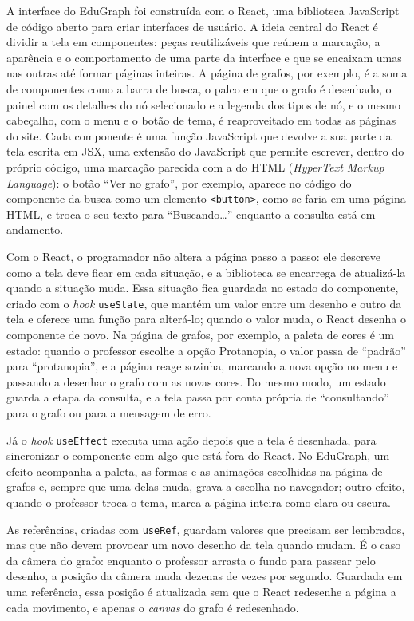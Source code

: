 A interface do EduGraph foi construída com o React, uma biblioteca JavaScript de código aberto para criar interfaces de usuário. A ideia central do React é dividir a tela em componentes: peças reutilizáveis que reúnem a marcação, a aparência e o comportamento de uma parte da interface e que se encaixam umas nas outras até formar páginas inteiras. A página de grafos, por exemplo, é a soma de componentes como a barra de busca, o palco em que o grafo é desenhado, o painel com os detalhes do nó selecionado e a legenda dos tipos de nó, e o mesmo cabeçalho, com o menu e o botão de tema, é reaproveitado em todas as páginas do site. Cada componente é uma função JavaScript que devolve a sua parte da tela escrita em JSX, uma extensão do JavaScript que permite escrever, dentro do próprio código, uma marcação parecida com a do HTML (\textit{HyperText Markup Language}): o botão ``Ver no grafo'', por exemplo, aparece no código do componente da busca como um elemento \texttt{<button>}, como se faria em uma página HTML, e troca o seu texto para ``Buscando\ldots'' enquanto a consulta está em andamento.

Com o React, o programador não altera a página passo a passo: ele descreve como a tela deve ficar em cada situação, e a biblioteca se encarrega de atualizá-la quando a situação muda. Essa situação fica guardada no estado do componente, criado com o \textit{hook} \texttt{useState}, que mantém um valor entre um desenho e outro da tela e oferece uma função para alterá-lo; quando o valor muda, o React desenha o componente de novo. Na página de grafos, por exemplo, a paleta de cores é um estado: quando o professor escolhe a opção Protanopia, o valor passa de ``padrão'' para ``protanopia'', e a página reage sozinha, marcando a nova opção no menu e passando a desenhar o grafo com as novas cores. Do mesmo modo, um estado guarda a etapa da consulta, e a tela passa por conta própria de ``consultando'' para o grafo ou para a mensagem de erro.

Já o \textit{hook} \texttt{useEffect} executa uma ação depois que a tela é desenhada, para sincronizar o componente com algo que está fora do React. No EduGraph, um efeito acompanha a paleta, as formas e as animações escolhidas na página de grafos e, sempre que uma delas muda, grava a escolha no navegador; outro efeito, quando o professor troca o tema, marca a página inteira como clara ou escura.

As referências, criadas com \texttt{useRef}, guardam valores que precisam ser lembrados, mas que não devem provocar um novo desenho da tela quando mudam. É o caso da câmera do grafo: enquanto o professor arrasta o fundo para passear pelo desenho, a posição da câmera muda dezenas de vezes por segundo. Guardada em uma referência, essa posição é atualizada sem que o React redesenhe a página a cada movimento, e apenas o \textit{canvas} do grafo é redesenhado.

